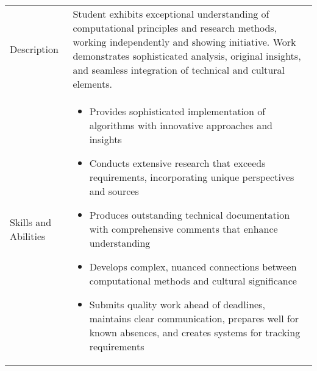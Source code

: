 \documentclass[12pt]{article}
\begin{document}
\begin{table}[b]
\renewcommand{\arraystretch}{1.5}
\begin{tabular}{>{\raggedright\arraybackslash}p{2cm}|>{\raggedright\arraybackslash}p{14cm}}
\toprule
\multicolumn{2}{l}{\textbf{Extending}} \\
\midrule
Description & Student exhibits exceptional understanding of computational principles and research methods, working independently and showing initiative. Work demonstrates sophisticated analysis, original insights, and seamless integration of technical and cultural elements. \\
\midrule
Skills and Abilities & 
\begin{itemize}
    \item Provides sophisticated implementation of algorithms with innovative approaches and insights
    \item Conducts extensive research that exceeds requirements, incorporating unique perspectives and sources
    \item Produces outstanding technical documentation with comprehensive comments that enhance understanding
    \item Develops complex, nuanced connections between computational methods and cultural significance
    \item Submits quality work ahead of deadlines, maintains clear communication, prepares well for known absences, and creates systems for tracking requirements
\end{itemize} \\
\bottomrule
\end{tabular}
\end{table}
\vspace{1cm}
\end{document}
